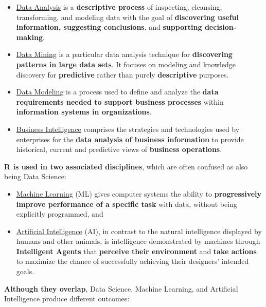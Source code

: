 \documentclass[]{book}
\theoremstyle{definition}
\theoremstyle{definition}
\theoremstyle{definition}
\theoremstyle{remark}
\begin{document}
\begin{itemize}
\item
  \href{https://en.wikipedia.org/wiki/Data_analysis}{Data Analysis} is a
  \textbf{descriptive process} of inspecting, cleansing, transforming,
  and modeling data with the goal of \textbf{discovering useful
  information, suggesting conclusions}, and \textbf{supporting
  decision-making}.
\item
  \href{https://en.wikipedia.org/wiki/Data_mining}{Data Mining} is a
  particular data analysis technique for \textbf{discovering patterns in
  large data sets}. It focuses on modeling and knowledge discovery for
  \textbf{predictive} rather than purely \textbf{descriptive} purposes.
\item
  \href{https://en.wikipedia.org/wiki/Data_modeling}{Data Modeling} is a
  process used to define and analyze the \textbf{data requirements
  needed to support business processes} within \textbf{information
  systems in organizations}.
\item
  \href{https://en.wikipedia.org/wiki/Business_intelligence}{Business
  Intelligence} comprises the strategies and technologies used by
  enterprises for the \textbf{data analysis of business information} to
  provide historical, current and predictive views of \textbf{business
  operations}.
\end{itemize}

\textbf{R is used in two associated disciplines}, which are often
confused as also being Data Science:

\begin{itemize}
\item
  \href{https://en.wikipedia.org/wiki/Machine_learning}{Machine
  Learning} (ML) gives computer systems the ability to
  \textbf{progressively improve performance of a specific task} with
  data, without being explicitly programmed, and
\item
  \href{https://en.wikipedia.org/wiki/Artificial_intelligence}{Artificial
  Intelligence} (AI), in contrast to the natural intelligence displayed
  by humans and other animals, is intelligence demonstrated by machines
  through \textbf{Intelligent Agents} that \textbf{perceive their
  environment} and \textbf{take actions} to maximize the chance of
  successfully achieving their designers' intended goals.
\end{itemize}

\textbf{Although they overlap}, Data Science, Machine Learning, and
Artificial Intelligence produce different outcomes:
\end{document}
